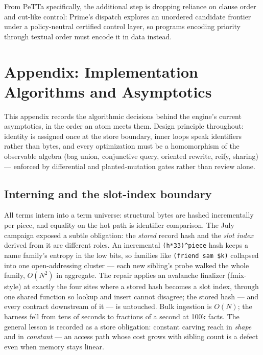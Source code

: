 \documentclass[11pt]{article}
\newcommand{\code}[1]{\texttt{#1}}
\newcommand{\PeTTa}{\textup{PeTTa}}
\begin{document}
From \PeTTa{} specifically, the additional step is dropping reliance on
clause order and cut-like control: Prime's dispatch explores an
unordered candidate frontier under a policy-neutral certified control
layer, so programs encoding priority through textual order must encode
it in data instead.


\section{Appendix: Implementation Algorithms and Asymptotics}
\label{app:algorithms}

This appendix records the algorithmic decisions behind the engine's
current asymptotics, in the order an atom meets them.  Design principle
throughout: identity is assigned once at the store boundary, inner loops
speak identifiers rather than bytes, and every optimization must be a
homomorphism of the observable algebra (bag union, conjunctive query,
oriented rewrite, reify, sharing) --- enforced by differential and
planted-mutation gates rather than review alone.

\subsection{Interning and the slot-index boundary}

All terms intern into a term universe: structural bytes are hashed
incrementally per piece, and equality on the hot path is identifier
comparison.  The July campaign exposed a subtle obligation: the
\emph{stored} record hash and the \emph{slot index} derived from it are
different roles.  An incremental \code{(h*33)\^{}piece} hash keeps a
name family's entropy in the low bits, so families like
\code{(friend sam \$k)} collapsed into one open-addressing cluster ---
each new sibling's probe walked the whole family, $O(N^2)$ in
aggregate.  The repair applies an avalanche finalizer (fmix-style) at
exactly the four sites where a stored hash becomes a slot index,
through one shared function so lookup and insert cannot disagree; the
stored hash --- and every contract downstream of it --- is untouched.
Bulk ingestion is $O(N)$; the harness fell from tens of seconds to
fractions of a second at 100k facts.  The general lesson is recorded as
a store obligation: constant carving reach in \emph{shape} and in
\emph{constant} --- an access path whose cost grows with sibling count
is a defect even when memory stays linear.
\end{document}
